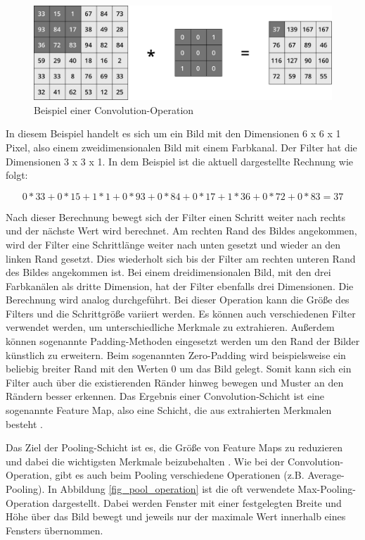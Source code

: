 \begin{figure}[h]
\centering
\includegraphics[scale=0.4]{images/conv_operation.pdf}
\caption{Beispiel einer Convolution-Operation}
\label{fig_conv_operation}
\end{figure}

In diesem Beispiel handelt es sich um ein Bild mit den Dimensionen 6 x 6 x 1 Pixel, also einem zweidimensionalen Bild mit einem Farbkanal. Der Filter hat die Dimensionen 3 x 3 x 1. In dem Beispiel ist die aktuell dargestellte Rechnung wie folgt:

\begin{equation*}
0*33+0*15+1*1+0*93+0*84+0*17+1*36+0*72+0*83=37
\end{equation*}

Nach dieser Berechnung bewegt sich der Filter einen Schritt weiter nach rechts und der nächste Wert wird berechnet. Am rechten Rand des Bildes angekommen, wird der Filter eine Schrittlänge weiter nach unten gesetzt und wieder an den linken Rand gesetzt. Dies wiederholt sich bis der Filter am rechten unteren Rand des Bildes angekommen ist. Bei einem dreidimensionalen Bild, mit den drei Farbkanälen als dritte Dimension, hat der Filter ebenfalls drei Dimensionen. Die Berechnung wird analog durchgeführt. Bei dieser Operation kann die Größe des Filters und die Schrittgröße variiert werden. Es können auch verschiedenen Filter verwendet werden, um unterschiedliche Merkmale zu extrahieren. Außerdem können sogenannte Padding-Methoden eingesetzt werden um den Rand der Bilder künstlich zu erweitern. Beim sogenannten Zero-Padding wird beispielsweise ein beliebig breiter Rand mit den Werten 0 um das Bild gelegt. Somit kann sich ein Filter auch über die existierenden Ränder hinweg bewegen und Muster an den Rändern besser erkennen. Das Ergebnis einer Convolution-Schicht ist eine sogenannte Feature Map, also eine Schicht, die aus extrahierten Merkmalen besteht \cite{lecun1997convolutional}.

Das Ziel der Pooling-Schicht ist es, die Größe von Feature Maps zu reduzieren und dabei die wichtigsten Merkmale beizubehalten \cite{scherer2010evaluation}. Wie bei der Convolution-Operation, gibt es auch beim Pooling verschiedene Operationen (z.B. Average-Pooling). In Abbildung \ref{fig_pool_operation} ist die oft verwendete Max-Pooling-Operation dargestellt. Dabei werden Fenster mit einer festgelegten Breite und Höhe über das Bild bewegt und jeweils nur der maximale Wert innerhalb eines Fensters übernommen.

